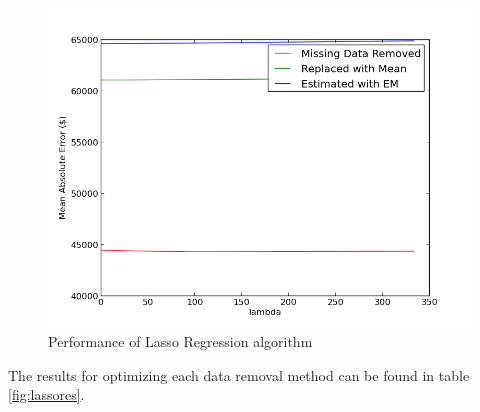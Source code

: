 \documentclass{acm_proc_article-sp}
\begin{document}
	 \begin{figure}[!htbp]
   		\centering
  		\includegraphics[width=\linewidth]{lasso_tuning_plot.png}
    		\caption{Performance of Lasso Regression algorithm}
    		\label{fig:lassoreg}
	\end{figure}
	The results for optimizing each data removal method can be found in table \ref{fig:lassores}.
\end{document}
